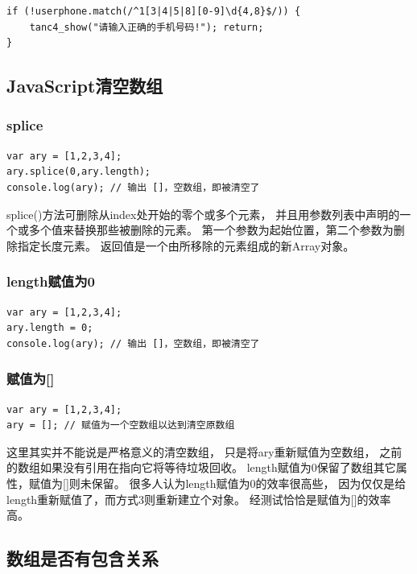 \documentclass{book}
\begin{document}
\begin{lstlisting}[language=VBSCript]
if (!userphone.match(/^1[3|4|5|8][0-9]\d{4,8}$/)) {
    tanc4_show("请输入正确的手机号码!"); return;
}
\end{lstlisting}

\subsection{JavaScript清空数组}

\subsubsection{splice}

\begin{lstlisting}[language=VBScript]
var ary = [1,2,3,4];
ary.splice(0,ary.length);
console.log(ary); // 输出 []，空数组，即被清空了
\end{lstlisting}

splice()方法可删除从index处开始的零个或多个元素，
并且用参数列表中声明的一个或多个值来替换那些被删除的元素。
第一个参数为起始位置，第二个参数为删除指定长度元素。
返回值是一个由所移除的元素组成的新Array对象。

\subsubsection{length赋值为0}

\begin{lstlisting}[language=VBScript]
var ary = [1,2,3,4];
ary.length = 0;
console.log(ary); // 输出 []，空数组，即被清空了
\end{lstlisting}


\subsubsection{赋值为[]}

\begin{lstlisting}[language=VBScript]
var ary = [1,2,3,4];
ary = []; // 赋值为一个空数组以达到清空原数组
\end{lstlisting}

这里其实并不能说是严格意义的清空数组，
只是将ary重新赋值为空数组，
之前的数组如果没有引用在指向它将等待垃圾回收。
length赋值为0保留了数组其它属性，赋值为[]则未保留。
很多人认为length赋值为0的效率很高些，
因为仅仅是给length重新赋值了，而方式3则重新建立个对象。
经测试恰恰是赋值为[]的效率高。

\subsection{数组是否有包含关系}
\end{document}
